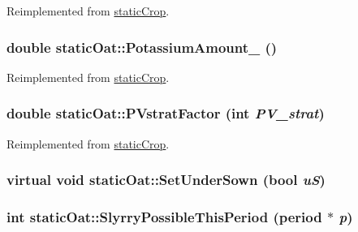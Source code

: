 Reimplemented from \hyperlink{classstatic_crop_abaa5c59d4074d47dedc79172f8326e08}{staticCrop}.\hypertarget{classstatic_oat_ac51205b35024c79cd19f50baf6bbb803}{
\subsubsection[{PotassiumAmount\_\-}]{\setlength{\rightskip}{0pt plus 5cm}double staticOat::PotassiumAmount\_\- ()}}
\label{classstatic_oat_ac51205b35024c79cd19f50baf6bbb803}


Reimplemented from \hyperlink{classstatic_crop_a41fee98d728c7670e6acb504a9b3459d}{staticCrop}.\hypertarget{classstatic_oat_af4d6207a79cfdb61327d060e5045078e}{
\subsubsection[{PVstratFactor}]{\setlength{\rightskip}{0pt plus 5cm}double staticOat::PVstratFactor (int {\em PV\_\-strat})}}
\label{classstatic_oat_af4d6207a79cfdb61327d060e5045078e}


Reimplemented from \hyperlink{classstatic_crop_ae4f07498c1616eab212386faf352d348}{staticCrop}.\hypertarget{classstatic_oat_a6f91239da2b953258084806375b60516}{
\subsubsection[{SetUnderSown}]{\setlength{\rightskip}{0pt plus 5cm}virtual void staticOat::SetUnderSown (bool {\em uS})}}
\label{classstatic_oat_a6f91239da2b953258084806375b60516}
\hypertarget{classstatic_oat_af1a87e97ec3a1521096e94b530bd4ac0}{
\subsubsection[{SlyrryPossibleThisPeriod}]{\setlength{\rightskip}{0pt plus 5cm}int staticOat::SlyrryPossibleThisPeriod ({\bf period} $\ast$ {\em p})}}
\label{classstatic_oat_af1a87e97ec3a1521096e94b530bd4ac0}


